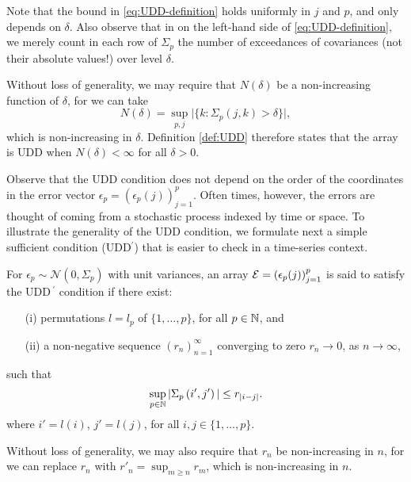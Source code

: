 Note that the bound in \eqref{eq:UDD-definition} holds uniformly in $j$ and $p$, and only depends on $\delta$.
Also observe that in on the left-hand side of \eqref{eq:UDD-definition}, we merely count in each row of $\Sigma_p$ the number of exceedances of covariances (not their absolute values!) over level $\delta$.

\begin{remark} \label{rmk:choice-of-N(delta)}
Without loss of generality, we may require that $N(\delta)$ be a non-increasing function of $\delta$, for we can take
$$
N(\delta) = \sup_{p,j} \Big|\{k:\Sigma_p(j,k)>\delta\}\Big|,
$$
which is non-increasing in $\delta$.
Definition \ref{def:UDD} therefore states that the array is UDD when $N(\delta)<\infty$ for all $\delta>0$.
\end{remark}


Observe that the UDD condition does not depend on the order of the coordinates in the error 
vector $\epsilon_p = (\epsilon_p(j))_{j=1}^p$.  Often times, however, the errors are thought of 
coming from a stochastic process indexed by time or space.  To illustrate the generality of the 
UDD condition, we formulate next a simple sufficient condition (UDD$^\prime$) that is easier to 
check in a time-series context.

\begin{definition}\label{d:UDD-prime}
For $\epsilon_p \sim \mathcal N(0,\Sigma_p)$ with unit variances, an array ${\cal E} = \left(\epsilon_p(j)\right)_{j=1}^p$ is said to satisfy the UDD\,$^\prime$ condition if there 
exist:
\begin{enumerate}
    \item[(i)] permutations $l = l_p$ of $\{1,\ldots,p\}$, for all $p\in\mathbb N$, and
    \item[(ii)] a non-negative sequence $(r_n)_{n=1}^\infty$ converging to zero $r_n\to 0$, as $n\to\infty$,
\end{enumerate}
such that 
\begin{equation} \label{eq:weak-correlation}
    \sup_{p\in\N} |\Sigma_p\left(i',j'\right)| \le r_{|i-j|}.
\end{equation}
where $i' = l(i)$, $j' = l(j)$, for all $i,j\in\{1,\ldots,p\}$.
\end{definition}

\begin{remark}
Without loss of generality, we may also require that $r_n$ be non-increasing in $n$, for we can replace $r_n$ with $r'_n = \sup_{m\ge n} r_m$, which is non-increasing in $n$.
\end{remark}

